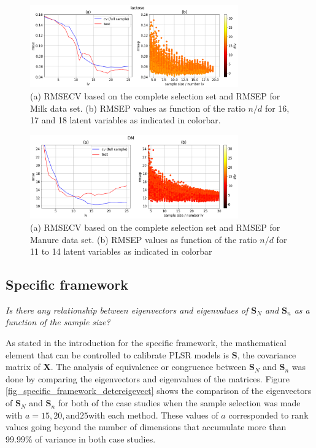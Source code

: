 \documentclass[journal=ancham,manuscript=article]{achemso}
\begin{document}
\begin{figure}[b]
\includegraphics[width=0.8\textwidth]{manuscript/figures/d01_milk_general_framework.png}
\centering
\caption{(a) RMSECV based on the complete selection set and RMSEP for Milk data set. (b) RMSEP values as function of the ratio $n/d$ for 16, 17 and 18 latent variables as indicated in colorbar.}
\label{fig_d01_milk_general_framework}
\end{figure}

\begin{figure}[b]
\includegraphics[width=0.8\textwidth]{manuscript/figures/d02_manure_general_framework.png}
\centering
\caption{(a) RMSECV based on the complete selection set and RMSEP for Manure data set. (b) RMSEP values as function of the ratio $n/d$ for 11 to 14 latent variables as indicated in colorbar}
\label{fig_d02_manure_general_framework}
\end{figure}

\subsection*{Specific framework}\label{results:specframework}

\emph{Is there any relationship between eigenvectors and eigenvalues of $\mathbf{S}_N$ and $\mathbf{S}_n$ as a function of the sample size?}

As stated in the introduction for the specific framework, the mathematical element that can be controlled to calibrate PLSR models is $\mathbf{S}$, the covariance matrix of $\mathbf{X}$. The analysis of equivalence or congruence between $\mathbf{S}_N$ and $\mathbf{S}_n$ was done by comparing the eigenvectors and eigenvalues of the matrices. Figure \ref{fig_specific_framework_detereigevect} shows the comparison of the eigenvectors of $\mathbf{S}_N$ and $\mathbf{S}_n$ for both of the case studies when the sample selection was made with $a=15,20,\text{and} 25$with each method. These values of $a$ corresponded to rank values going beyond the number of dimensions that accumulate more than 99.99\% of variance in both case studies.
\end{document}
